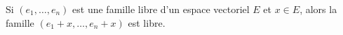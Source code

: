 Si $(e_1,\ldots,e_n)$ est une famille libre d'un espace vectoriel $E$ et $x\in E$, alors la famille $(e_1+x,\ldots,e_n+x)$ est libre.

\begin{reponses}
\end{reponses}

